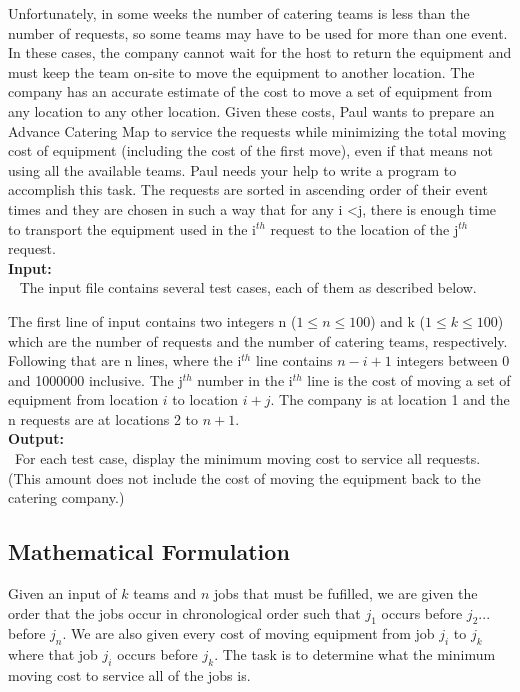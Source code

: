 \documentclass[12pt]{article}
\begin{document}
Unfortunately, in some weeks the number of catering teams is less than the number of requests, so some teams may
have to be used for more than one event. In these cases, the company cannot wait for the host to return the
equipment and must keep the team on-site to move the equipment to another location. The company has an accurate
estimate of the cost to move a set of equipment from any location to any other location. Given these costs, Paul
wants to prepare an Advance Catering Map to service the requests while minimizing the total moving cost of
equipment (including the cost of the first move), even if that means not using all the available teams. Paul
needs your help to write a program to accomplish this task. The requests are sorted in ascending order of their
event times and they are chosen in such a way that for any i \textless j, there is enough time to transport the
equipment used in the i$^{th}$ request to the location of the j$^{th}$ request. \\

\noindent \textbf{Input:} \\
~\indent
The input file contains several test cases, each of them as described below.

The first line of input contains two integers n ($1 \leq n \leq 100$) and k ($1 \leq k \leq 100$) which are the
number of requests and the number of catering teams, respectively. Following that are n lines, where the i$^{th}$
line contains $n - i + 1$ integers between 0 and 1000000 inclusive. The j$^{th}$ number in the i$^{th}$ line is the
cost of moving a set of equipment from location $i$ to location $i + j$. The company is at location 1 and the n
requests are at locations 2 to $n + 1$. \\

\noindent \textbf{Output:} \\
~\indent For each test case, display the minimum moving cost to service all requests. (This amount does not
include the cost of moving the equipment back to the catering company.)



\newpage

\subsection{Mathematical Formulation}
Given an input of $k$ teams and $n$ jobs that must be fufilled, we are given the order that the jobs occur in
chronological order such that $j_1$ occurs before $j_2 ...$before $j_n$. We are also given every cost of moving
equipment from job $j_i$ to $j_k$ where that job $j_i$ occurs before $j_k$. The task is to determine what the
minimum moving cost to service all of the jobs is.
\end{document}
